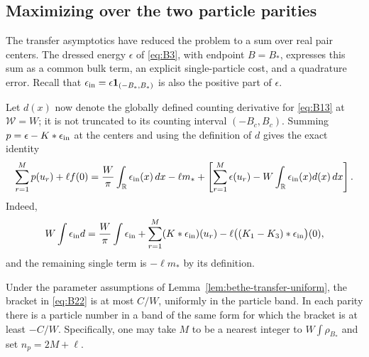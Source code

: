 \subsection{Maximizing over the two particle parities}
\label{subsec:bethe-parity-max}

The transfer asymptotics have reduced the problem to a sum over real
pair centers.  The dressed energy $\epsilon$ of \eqref{eq:B3}, with
endpoint $B=B_*$, expresses this sum as a common bulk term, an explicit
single-particle cost, and a quadrature error.  Recall that
$\epsilon_{\rm in}=\epsilon\mathbf1_{(-B_*,B_*)}$ is also the positive
part of $\epsilon$.

Let $d(x)$ now denote the globally defined counting derivative for
\eqref{eq:B13} at $\mathcal W=W$; it is not truncated to its counting
interval $(-B_c,B_c)$.  Summing $p=\epsilon-K*\epsilon_{\rm in}$ at
the centers and using the definition of $d$ gives the exact identity
\begin{equation}
 \sum_{r=1}^M p(u_r)+\ell f(0)
 =\frac{W}{\pi}\int_{\mathbb R}\epsilon_{\rm in}(x)\,dx-\ell m_*
  +\left[\sum_{r=1}^M\epsilon(u_r)
        -W\int_{\mathbb R}\epsilon_{\rm in}(x)d(x)\,dx\right].
 \label{eq:B22}
\end{equation}
Indeed,
\[
 W\int\epsilon_{\rm in}d
 =\frac{W}{\pi}\int\epsilon_{\rm in}
   +\sum_{r=1}^M(K*\epsilon_{\rm in})(u_r)
   -\ell\bigl((K_1-K_3)*\epsilon_{\rm in}\bigr)(0),
\]
and the remaining single term is $-\ell m_*$ by its definition.

\begin{lemma}
\label{lem:bethe-parity-error}
Under the parameter assumptions of Lemma~\ref{lem:bethe-transfer-uniform},
the bracket in \eqref{eq:B22} is at most $C/W$, uniformly in the particle
band.  In each parity there is a particle number in a band of the same
form for which the bracket is at least $-C/W$.  Specifically, one may
take $M$ to be a nearest integer to $W\int\rho_{B_*}$ and set
$n_p=2M+\ell$.
\end{lemma}

